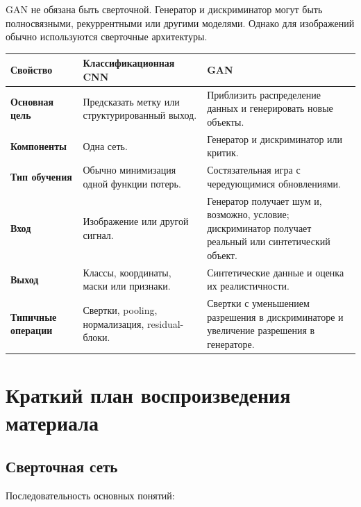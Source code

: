 \documentclass[12pt,a4paper]{article}
\numberwithin{equation}{section}
\theoremstyle{definition}
\theoremstyle{remark}
\begin{document}
GAN не обязана быть сверточной. Генератор и дискриминатор могут быть
полносвязными, рекуррентными или другими моделями. Однако для
изображений обычно используются сверточные архитектуры.

\begin{center}
\begin{tabularx}{\textwidth}{
    >{\bfseries}p{3.4cm}
    X
    X
}
\toprule
Свойство & Классификационная CNN & GAN\\
\midrule

Основная цель
&
Предсказать метку или структурированный выход.
&
Приблизить распределение данных и генерировать новые объекты.\\

Компоненты
&
Одна сеть.
&
Генератор и дискриминатор или критик.\\

Тип обучения
&
Обычно минимизация одной функции потерь.
&
Состязательная игра с чередующимися обновлениями.\\

Вход
&
Изображение или другой сигнал.
&
Генератор получает шум и, возможно, условие; дискриминатор получает
реальный или синтетический объект.\\

Выход
&
Классы, координаты, маски или признаки.
&
Синтетические данные и оценка их реалистичности.\\

Типичные операции
&
Свертки, pooling, нормализация, residual-блоки.
&
Свертки с уменьшением разрешения в дискриминаторе и увеличение
разрешения в генераторе.\\
\bottomrule
\end{tabularx}
\end{center}

\section{Краткий план воспроизведения материала}

\subsection*{Сверточная сеть}

Последовательность основных понятий:
\end{document}
